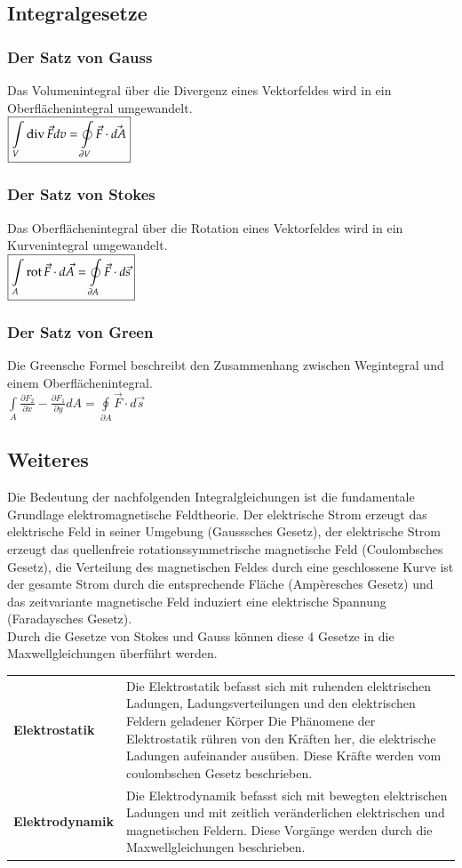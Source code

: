 \subsection{Integralgesetze}
\subsubsection{Der Satz von Gauss}
Das Volumenintegral über die Divergenz eines Vektorfeldes wird in ein Oberflächenintegral umgewandelt.\\
$\boxed{\int\limits_V \operatorname{div} \vec F dv = \oint\limits_{\partial V} \vec F \cdot \vec{dA}}$
\subsubsection{Der Satz von Stokes}
Das Oberflächenintegral über die Rotation eines Vektorfeldes wird in ein Kurvenintegral umgewandelt. \\
$\boxed{\int\limits_A \operatorname{rot} \vec{F}\cdot d\vec{A}  = \oint\limits_{\partial A}\vec{F}\cdot d\vec{s}}$
\subsubsection{Der Satz von Green}
Die Greensche Formel beschreibt den Zusammenhang zwischen Wegintegral und einem Oberflächenintegral.\\
$\boxed{\int\limits_A \frac{\partial F_2}{\partial x} - \frac{\partial F_1}{\partial y} dA = \oint\limits_{\partial A}\vec{F}\cdot d\vec{s}}$
\subsection{Weiteres}
Die Bedeutung der nachfolgenden Integralgleichungen ist die fundamentale Grundlage elektromagnetische Feldtheorie. Der elektrische Strom erzeugt das elektrische Feld in seiner Umgebung (Gausssches Gesetz), der elektrische Strom erzeugt das quellenfreie rotationssymmetrische magnetische Feld (Coulombsches Gesetz), die Verteilung des magnetischen Feldes durch eine geschlossene Kurve ist der gesamte Strom durch die entsprechende Fläche (Ampèresches Gesetz) und das zeitvariante magnetische Feld induziert eine elektrische Spannung (Faradaysches Gesetz).\\
Durch die Gesetze von Stokes und Gauss können diese 4 Gesetze in die Maxwellgleichungen überführt werden. 
\vspace{-0.8cm}
\begin{longtable}{p{} p{}}
	\textbf{Elektrostatik} & Die Elektrostatik befasst sich mit ruhenden elektrischen Ladungen, Ladungsverteilungen und den elektrischen Feldern geladener Körper
	Die Phänomene der Elektrostatik rühren von den Kräften her, die elektrische Ladungen aufeinander ausüben. Diese Kräfte werden vom coulombschen Gesetz beschrieben.\\
	\textbf{Elektrodynamik} & Die Elektrodynamik befasst sich mit bewegten elektrischen Ladungen und mit zeitlich veränderlichen elektrischen und magnetischen Feldern. Diese Vorgänge werden durch die Maxwellgleichungen beschrieben. \\
\end{longtable}
